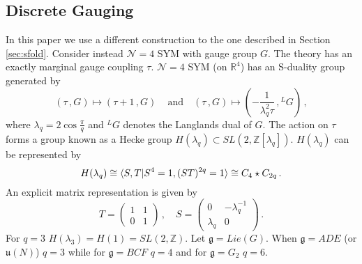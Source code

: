 \documentclass[main.tex]{subfiles}
\begin{document}
\subsection{Discrete Gauging}\label{sec:SdualN=41}
In this paper we use a different construction to the one described in Section \ref{sec:sfold}. Consider instead $\mathcal{N}=4$ SYM with gauge group $G$. The theory has an exactly marginal gauge coupling $\tau$. $\mathcal{N}=4$ SYM (on $\mathbb{R}^4$) has an S-duality group generated by \cite{MONTONEN1977117,GNO,Vafa:1994tf,Argyres:2006qr,Dorey:1996hx,Girardello:1995gf,Kapustin:2006pk}
\begin{equation}\label{eqn:Sdual}
\left(\tau\,,G\right)\mapsto \left(\tau+1\,,G\right)\,\quad \text{and} \quad\left(\tau\,,G\right)\mapsto\left(-\frac{1}{\lambda_q^2\tau}\,,{}^LG\right)\, ,
\end{equation}
where $\lambda_q=2\cos\frac{\pi}{q}$ and ${}^LG$ denotes the Langlands dual of $G$. The action on $\tau$ forms a group known as a Hecke group $H(\lambda_q)\subset SL(2,\mathbb{Z}\left[\lambda_q\right])$. $H(\lambda_q)$ can be represented by
\begin{equation}
H(\lambda_q)\cong\langle S,T|S^4=1,(ST)^{2q}=1\rangle\cong C_4\star C_{2q}\,.
\end{equation}
An explicit matrix representation is given by
\begin{equation}
T=\begin{pmatrix}
1&1\\
0&1
\end{pmatrix}\,,\quad S =\begin{pmatrix}
0&-\lambda_q^{-1}\\
\lambda_q&0
\end{pmatrix}\,.
\end{equation}
For $q=3$ $H(\lambda_3)=H(1)=SL(2,\mathbb{Z})$. Let $\mathfrak{g}=Lie(G)$. When $\mathfrak{g}=ADE$ (or $\mathfrak{u}(N)$) $q=3$ while for $\mathfrak{g}=BCF$ $q=4$ and for $\mathfrak{g}=G_2$ $q=6$.
\begin{comment} It can be shown that
\begin{equation}\label{eqn:Heckegroup}
H(\lambda_q)\iso\langle s,t,w|s^2=t^q=w,w^2=1\rangle \, ,
\end{equation}
with the isomorphism made by $s=S$, $t=ST$ \cite{singerman1998,ikikardes2006,LANG2000220}.\footnote{Generally Hecke groups are usually discussed for $\tau\in\mathbb{H}$ in that case they are related to our discussion as $H'(\lambda_q)=H(\lambda_q)/\langle w\rangle$, then $H'(\lambda_3)\iso PSL(2,\mathbb{Z})$. When we say Hecke group we always mean the $\mathbb{Z}_2$ central extension $0\to H'(\lambda_q)\to H(\lambda_q)\to\mathbb{Z}_2\to0$.} 
\end{comment}
\end{document}
